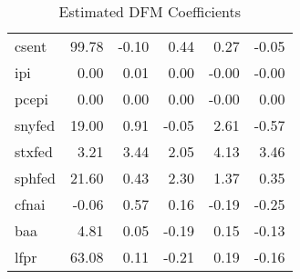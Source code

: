 \documentclass[11pt, letterpaper]{article}\usepackage[]{graphicx}\usepackage[]{color}
\begin{document}
\begin{table}[H]
\begin{tabular}{lrrrrr}
  csent & 99.78 & -0.10 & 0.44 & 0.27 & -0.05 \\ 
  ipi & 0.00 & 0.01 & 0.00 & -0.00 & -0.00 \\ 
  pcepi & 0.00 & 0.00 & 0.00 & -0.00 & 0.00 \\ 
  snyfed & 19.00 & 0.91 & -0.05 & 2.61 & -0.57 \\ 
  stxfed & 3.21 & 3.44 & 2.05 & 4.13 & 3.46 \\ 
  sphfed & 21.60 & 0.43 & 2.30 & 1.37 & 0.35 \\ 
  cfnai & -0.06 & 0.57 & 0.16 & -0.19 & -0.25 \\ 
  baa & 4.81 & 0.05 & -0.19 & 0.15 & -0.13 \\ 
  lfpr & 63.08 & 0.11 & -0.21 & 0.19 & -0.16 \\ 
   \hline
\end{tabular}
\endgroup
\caption{Estimated DFM Coefficients} 
\end{table}
\end{document}
